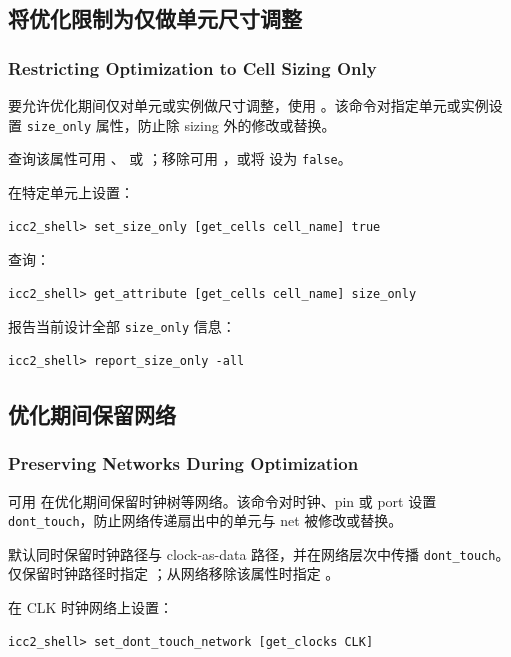 \subsection{将优化限制为仅做单元尺寸调整}
\subsubsection*{Restricting Optimization to Cell Sizing Only}

要允许优化期间仅对单元或实例做尺寸调整，使用 。该命令对指定单元或实例设置 \texttt{size\_only} 属性，防止除 sizing 外的修改或替换。

查询该属性可用 、 或 ；移除可用 ，或将  设为 \texttt{false}。

在特定单元上设置：
\begin{lstlisting}
icc2_shell> set_size_only [get_cells cell_name] true
\end{lstlisting}

查询：
\begin{lstlisting}
icc2_shell> get_attribute [get_cells cell_name] size_only
\end{lstlisting}

报告当前设计全部 \texttt{size\_only} 信息：
\begin{lstlisting}
icc2_shell> report_size_only -all
\end{lstlisting}

\subsection{优化期间保留网络}
\subsubsection*{Preserving Networks During Optimization}

可用  在优化期间保留时钟树等网络。该命令对时钟、pin 或 port 设置 \texttt{dont\_touch}，防止网络传递扇出中的单元与 net 被修改或替换。

默认同时保留时钟路径与 clock-as-data 路径，并在网络层次中传播 \texttt{dont\_touch}。仅保留时钟路径时指定 ；从网络移除该属性时指定 。

在 CLK 时钟网络上设置：
\begin{lstlisting}
icc2_shell> set_dont_touch_network [get_clocks CLK]
\end{lstlisting}

